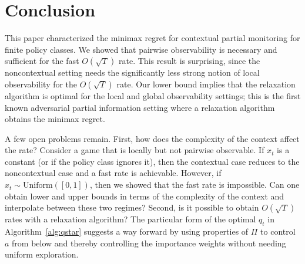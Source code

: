 \documentclass{article}
\begin{document}
\section{Conclusion}
This paper characterized the minimax regret for contextual partial monitoring for finite policy classes. We showed that pairwise observability is necessary and sufficient for the fast $O(\sqrt{T})$ rate. This result is surprising, since the noncontextual setting needs the significantly less strong notion of local observability for the $O(\sqrt{T})$ rate. Our lower bound implies that the relaxation algorithm is optimal for the local and global observability settings; this is the first known adversarial partial information setting where a relaxation algorithm obtains the minimax regret.

A few open problems remain. First, how does the complexity of the context affect the rate? Consider a game that is locally but not pairwise observable. If $x_t$ is a constant (or if the policy class ignores it), then the contextual case reduces to the noncontextual case and a fast rate is achievable. However, if $x_t\sim\mathrm{Uniform}([0,1])$, then we showed that the fast rate is impossible. Can one obtain lower and upper bounds in terms of the complexity of the context and interpolate between these two regimes? Second, is it possible to obtain $O(\sqrt{T})$ rates with a relaxation algorithm? The particular form of the optimal $q_t$ in Algorithm~\ref{alg:qstar} suggests a way forward by using properties of $\Pi$ to control $a$ from below and thereby controlling the importance weights without needing uniform exploration.


\end{document}
